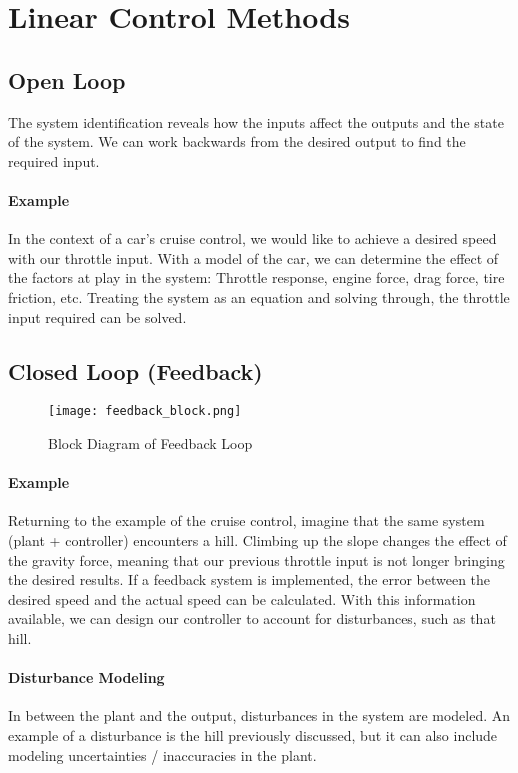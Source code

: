 \documentclass[../notes.tex]{subfiles}
\begin{document}
\section{Linear Control Methods}
\subsection{Open Loop}
The system identification reveals how the inputs affect the outputs and the state of the system. We can work backwards from the desired output to find the required input. 
\paragraph{Example} In the context of a car's cruise control, we would like to achieve a desired speed with our throttle input. With a model of the car, we can determine the effect of the factors at play in the system: Throttle response, engine force, drag force, tire friction, etc. Treating the system as an equation and solving through, the throttle input required can be solved.
\subsection{Closed Loop (Feedback)}
\begin{figure}[H]
    \centering
    \texttt{[image: feedback\_block.png]}
    \caption{Block Diagram of Feedback Loop}
    \label{fig:feedbackBlock}
\end{figure}
\paragraph{Example} Returning to the example of the cruise control, imagine that the same system (plant + controller) encounters a hill. Climbing up the slope changes the effect of the gravity force, meaning that our previous throttle input is not longer bringing the desired results. If a feedback system is implemented, the error between the desired speed and the actual speed can be calculated. With this information available, we can design our controller to account for disturbances, such as that hill.

\paragraph{Disturbance Modeling}
In between the plant and the output, disturbances in the system are modeled. An example of a disturbance is the hill previously discussed, but it can also include modeling uncertainties / inaccuracies in the plant.
\end{document}
